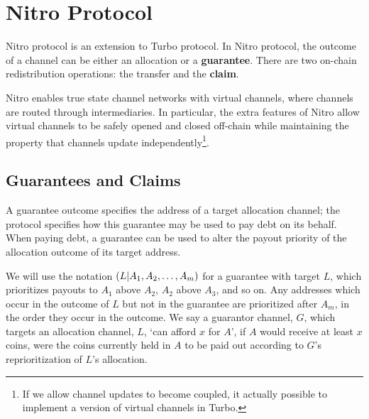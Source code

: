 \section{Nitro Protocol}

Nitro protocol is an extension to Turbo protocol.
In Nitro protocol, the outcome of a channel can be either an allocation or a \textbf{guarantee}.
There are two on-chain redistribution operations: the transfer and the \textbf{claim}.

Nitro enables true state channel networks with virtual channels, where channels are routed through intermediaries.
In particular, the extra features of Nitro allow virtual channels to be safely opened and closed off-chain while maintaining the property that channels update independently\footnote{If we allow channel updates to become coupled, it actually possible to implement a version of virtual channels in Turbo.}.

\subsection{Guarantees and Claims}

A guarantee outcome specifies the address of a target allocation channel; the protocol specifies how this guarantee may be used to pay debt on its behalf.
When paying debt, a guarantee can be used to alter the payout priority of the allocation outcome of its target address. 


We will use the notation $( L | A_1, A_2, \dots, A_m )$ for a guarantee with target $L$, which prioritizes payouts to $A_1$ above $A_2$, $A_2$ above $A_3$, and so on.
Any addresses which occur in the outcome of $L$ but not in the guarantee are prioritized after $A_m$, in the order they occur in the outcome.
We say a guarantor channel, $G$, which targets an allocation channel, $L$, `can afford $x$ for $A$', if $A$ would receive at least $x$ coins, were the coins currently held in $A$ to be paid out according to $G$'s reprioritization of $L$'s allocation.

